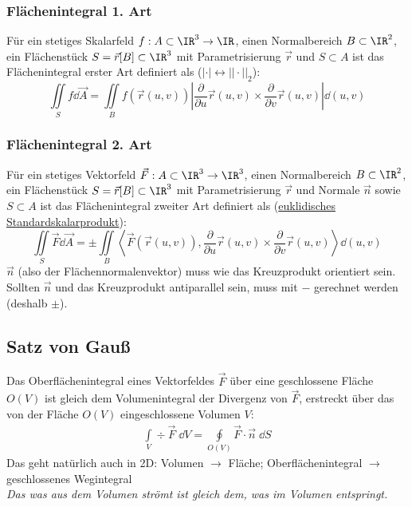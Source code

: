  \subsubsection{Flächenintegral 1. Art}
 Für ein stetiges Skalarfeld $f:A\subset\IR^3\to\IR$, einen Normalbereich $B\subset\IR^2$, ein Flächenstück $S=\vec{r}[B]\subset\IR^3$ mit Parametrisierung $\vec{r}$ und $S\subset A$ ist das Flächenintegral erster Art definiert als ($|\cdot|\leftrightarrow||\cdot||_2$):
 \begin{equation}
 	\iint\limits_S f \dd \vec{A} =\iint\limits_B f(\vec{r}(u,v))\left|\frac{\partial}{\partial u}\vec{r}(u,v)\times\frac{\partial}{\partial v}\vec{r}(u,v)\right| \dd (u,v)
 \end{equation}
 \subsubsection{Flächenintegral 2. Art}
 Für ein stetiges Vektorfeld $\vec{F}:A\subset\IR^3\to\IR^3$, einen Normalbereich $B\subset\IR^2$, ein Flächenstück $S=\vec{r}[B]\subset\IR^3$ mit Parametrisierung $\vec{r}$ und Normale $\vec{n}$ sowie $S\subset A$ ist das Flächenintegral zweiter Art definiert als (\href{https://de.wikipedia.org/wiki/Standardskalarprodukt}{euklidisches Standardskalarprodukt}):
 \begin{equation}
 \iint\limits_S\vec{F}\dd\vec{A}=\pm\iint\limits_B \left\langle\vec{F}(\vec{r}(u,v)), \frac{\partial}{\partial u}\vec{r}(u,v)\times\frac{\partial}{\partial v}\vec{r}(u,v)\right\rangle \dd (u,v)
 \end{equation}
 $\vec{n}$ (also der Flächennormalenvektor) muss wie das Kreuzprodukt orientiert sein. Sollten $\vec{n}$ und das Kreuzprodukt antiparallel sein, muss mit $-$ gerechnet werden (deshalb $\pm$).
  \subsection{Satz von Gauß}
	  Das Oberflächenintegral eines Vektorfeldes $\vec{F}$ über eine geschlossene
	  Fläche $O(V)$ ist gleich dem Volumenintegral der Divergenz von $\vec{F}$,
	  erstreckt über das von der Fläche $O(V)$ eingeschlossene Volumen $V$:
	  \begin{equation}\label{intgauss}
		  \begin{split}
			  \int\limits_{V} \div\vec{F}\; \dd V = \oint\limits_{O(V)}\vec{F}\cdot \vec
			  {n}\; \dd S
		  \end{split}
	  \end{equation}
	  Das geht natürlich auch in 2D: Volumen $\to$ Fläche; Oberflächenintegral $\to$
	  geschlossenes Wegintegral\\
	  \textit{Das was aus dem Volumen strömt ist gleich dem, was im Volumen entspringt.}
